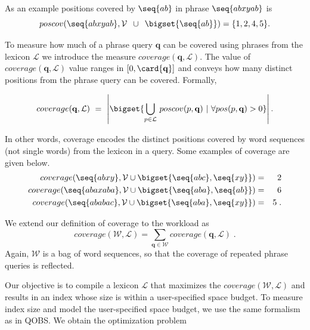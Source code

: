 As an example positions covered by $\seq{ab}$ in phrase $\seq{abxyab}$ is $$poscov(\seq{abxyab}, \mathcal{V} \,\,\,\cup \,\,\,\bigset{\seq{ab}}) = \{1,2,4,5\}.$$

To measure how much of a phrase query $\mathbf{q}$ can be
covered using phrases from the lexicon $\mathcal{L}$ 
we introduce the measure $coverage(\mathbf{q}, \mathcal{L})$. The value of $coverage(\mathbf{q}, \mathcal{L})$ value ranges in $[0,\card{\mathbf{q}}]$ and conveys how many distinct positions from the phrase query can be covered. Formally,

\begin{definition}[Coverage]
  $$
    coverage(\mathbf{q}, \mathcal{L}) \,\,= \,\, \left| \bigset{ \bigcup_{ p \in \mathcal{L}}{ \,poscov(p,\mathbf{q})} \,\,|\,\,\forall pos(p,\mathbf{q}) > 0} \right|.
  $$ 
\end{definition}

In other words, coverage encodes the distinct positions covered by word sequences (not single words) from the lexicon in a query. Some examples of coverage are given below.
\begin{eqnarray*}
  coverage(\seq{abxy}, \mathcal{V} \cup \bigset{\seq{abc}, \seq{xy}}) & = & 2 \\
  coverage(\seq{abaxaba}, \mathcal{V} \cup \bigset{\seq{aba}, \seq{ab}}) & = & 6 \\
  coverage(\seq{ababac}, \mathcal{V} \cup \bigset{\seq{aba}, \seq{xy}}) & = & 5\;.
\end{eqnarray*}


We extend our definition of coverage to the workload as
$$
coverage(\mathcal{W}, \mathcal{L}) = \sum_{\mathbf{q} \in \mathcal{W}} coverage(\mathbf{q}, \mathcal{L})\;.
$$
Again, $\mathcal{W}$ is a bag of word sequences, so that the coverage
of repeated phrase queries is reflected.

Our objective is to compile a lexicon $\mathcal{L}$ that maximizes
the $coverage(\mathcal{W}, \mathcal{L})$ and results in an index whose
size is within a user-specified space budget. To measure index size
and model the user-specified space budget, we use the same formalism
as in QOBS. We obtain the optimization problem

